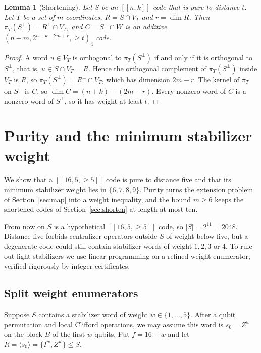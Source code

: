 \documentclass[11pt]{article}
\newtheorem{lemma}[theorem]{Lemma}
\theoremstyle{definition}
\theoremstyle{remark}
\newcommand{\qc}[1]{[\![#1]\!]}
\begin{document}
\begin{lemma}[Shortening]\label{lem:shorten}
Let \(S\) be an \(\qc{n,k}\) code that is pure to distance \(t\).
Let \(T\) be a set of \(m\) coordinates, \(R=S\cap V_T\) and
\(r=\dim R\). Then \(\pi_T(S^\perp)=R^\perp\cap V_T\), and
\(C=S^\perp\cap W\) is an additive \((n-m,2^{n+k-2m+r},{\geq}t)_4\)
code.
\end{lemma}
\begin{proof}
A word \(u\in V_T\) is orthogonal to \(\pi_T(S^\perp)\) if and only if
it is orthogonal to \(S^\perp\), that is, \(u\in S\cap V_T=R\). Hence
the orthogonal complement of \(\pi_T(S^\perp)\) inside \(V_T\) is \(R\),
so \(\pi_T(S^\perp)=R^\perp\cap V_T\), which has dimension \(2m-r\).
The kernel of \(\pi_T\) on \(S^\perp\) is \(C\), so
\(\dim C=(n+k)-(2m-r)\). Every nonzero word of \(C\) is a nonzero word
of \(S^\perp\), so it has weight at least \(t\).
\end{proof}

\section{Purity and the minimum stabilizer weight}\label{sec:purity}

We show that a \(\qc{16,5,{\geq}5}\) code is pure to distance five
and that its minimum stabilizer weight lies in \(\{6,7,8,9\}\). Purity
turns the extension problem of Section~\ref{sec:map} into a weight
inequality, and the bound \(m\geq6\) keeps the shortened codes of
Section~\ref{sec:shorten} at length at most ten.

From now on \(S\) is a hypothetical \(\qc{16,5,{\geq}5}\) code, so
\(|S|=2^{11}=2048\). Distance five forbids centralizer operators outside
\(S\) of weight below five, but a degenerate code could still contain
stabilizer words of weight \(1,2,3\) or \(4\). To rule out light
stabilizers we use linear programming on a refined weight enumerator,
verified rigorously by integer certificates.

\subsection{Split weight enumerators}

Suppose \(S\) contains a stabilizer word of weight
\(w\in\{1,\ldots,5\}\). After a qubit permutation and local Clifford operations, we may assume this
word is \(s_0=Z^w\) on the block \(B\) of the first \(w\) qubits. Put
\(f=16-w\) and let \(R=\langle s_0\rangle=\{I^w,Z^w\}\leq S\).
\end{document}
